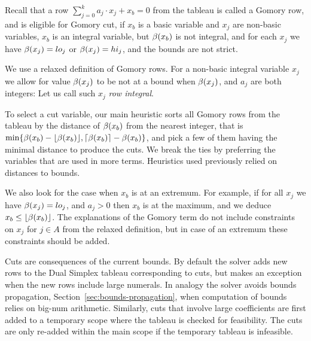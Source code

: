Recall that a row $\sum_{j=0}^{k} a_j\cdot x_j + x_b = 0$ 
from the tableau is called a Gomory row, and is eligible for Gomory cut, if $x_b$ is a basic variable and $x_j$ are non-basic variables,
$x_b$ is an integral variable, but $\beta(x_b)$ is not integral, and for each $x_j$ we have $\beta(x_j) = lo_j$ or $\beta(x_j) = hi_j$,
and the bounds are not strict. 

We use a relaxed definition of Gomory rows. For a non-basic integral variable $x_j$ we allow for value $\beta(x_j)$ to be not at a bound when $\beta(x_j)$, and $a_j$ are both integers: Let us call such $x_j$ \emph{row integral}.


To select a cut variable, our main heuristic sorts all Gomory rows from the tableau by the distance of $\beta(x_b)$ from the nearest integer, that is $\min \{ {\beta(x_b)-\lfloor \beta(x_b) \rfloor, \lceil \beta(x_b) \rceil - \beta(x_b)} \}$, and pick a few of them having the minimal distance to produce the cuts. We break the ties by preferring the variables that are used in more terms.
Heuristics used previously relied on distances to bounds.

We also look for the case when $x_b$ is at an extremum. For example, if for all $x_j$ we have $\beta(x_j) = lo_j$,
and $a_j > 0$ then $x_b$ is at the maximum, and we deduce $x_b \leq \lfloor \beta(x_b) \rfloor$.
The explanations of the Gomory term do not include constraints on $x_j$ for $j \in A$ from the relaxed definition,
but in case of an extremum these constraints should be added.


Cuts are consequences of the current bounds. By default the solver adds new rows to the Dual Simplex tableau corresponding to cuts,
but makes an exception when the new rows include large numerals.
In analogy the solver avoids bounds propagation, Section~\ref{sec:bounds-propagation},
when computation of bounds relies on big-num arithmetic.
Similarly, cuts that involve large coefficients are first added to a temporary scope where the tableau is checked for feasibility.
The cuts are only re-added within the main scope if the temporary tableau is infeasible.

